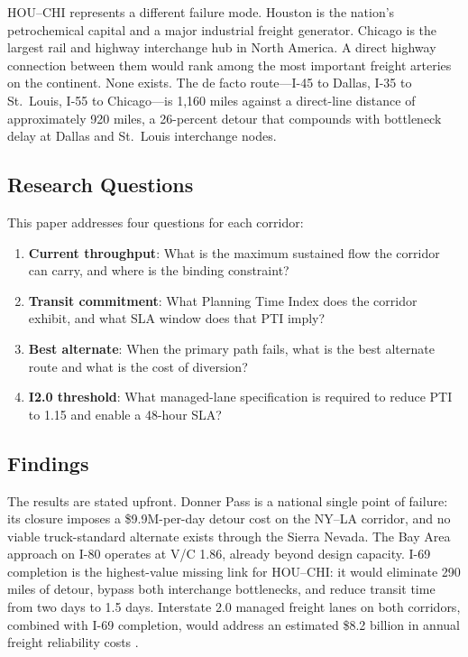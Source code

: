 HOU--CHI represents a different failure mode. Houston is the nation's petrochemical capital and a major industrial freight generator. Chicago is the largest rail and highway interchange hub in North America. A direct highway connection between them would rank among the most important freight arteries on the continent. None exists. The de facto route---I-45 to Dallas, I-35 to St.\ Louis, I-55 to Chicago---is 1,160 miles against a direct-line distance of approximately 920 miles, a 26-percent detour that compounds with bottleneck delay at Dallas and St.\ Louis interchange nodes.

\subsection{Research Questions}

This paper addresses four questions for each corridor:

\begin{enumerate}
  \item \textbf{Current throughput}: What is the maximum sustained flow the corridor can carry, and where is the binding constraint?
  \item \textbf{Transit commitment}: What Planning Time Index does the corridor exhibit, and what SLA window does that PTI imply?
  \item \textbf{Best alternate}: When the primary path fails, what is the best alternate route and what is the cost of diversion?
  \item \textbf{I2.0 threshold}: What managed-lane specification is required to reduce PTI to 1.15 and enable a 48-hour SLA?
\end{enumerate}

\subsection{Findings}

The results are stated upfront. Donner Pass is a national single point of failure: its closure imposes a \$9.9M-per-day detour cost on the NY--LA corridor, and no viable truck-standard alternate exists through the Sierra Nevada. The Bay Area approach on I-80 operates at V/C 1.86, already beyond design capacity. I-69 completion is the highest-value missing link for HOU--CHI: it would eliminate 290 miles of detour, bypass both interchange bottlenecks, and reduce transit time from two days to 1.5 days. Interstate 2.0 managed freight lanes on both corridors, combined with I-69 completion, would address an estimated \$8.2 billion in annual freight reliability costs \citep{ATRI_costs2024}.

